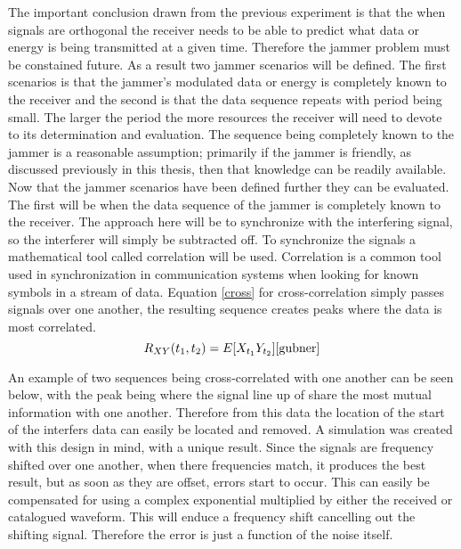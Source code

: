 The important conclusion drawn from the previous experiment is that the when signals are orthogonal the receiver needs to be able to predict what data or energy is being transmitted at a given time.  Therefore the jammer problem must be constained future.  As a result two jammer scenarios will be defined.  The first scenarios is that the jammer's modulated data or energy is completely known to the receiver and the second is that the data sequence repeats with period being small.  The larger the period the more resources the receiver will need to devote to its determination and evaluation.  The sequence being completely known to the jammer is a reasonable assumption; primarily if the jammer is friendly, as discussed previously in this thesis, then that knowledge can be readily available.\\

Now that the jammer scenarios have been defined further they can be evaluated.  The first will be when the data sequence of the jammer is completely known to the receiver.  The approach here will be to synchronize with the interfering signal, so the interferer will simply be subtracted off.  To synchronize the signals a mathematical tool called correlation will be used.  Correlation is a common tool used in synchronization in communication systems when looking for known symbols in a stream of data.  Equation \ref{cross} for cross-correlation simply passes signals over one another, the resulting sequence creates peaks where the data is most correlated.\\

\begin{equation}\label{cross}
R_{XY}(t_{1},t_{2})=E[X_{t_{1}}Y_{t_{2}}] \cite{gubner}
\end{equation}

An example of two sequences being cross-correlated with one another can be seen below, with the peak being where the signal line up of share the most mutual information with one another.  Therefore from this data the location of the start of the interfers data can easily be located and removed.  A simulation was created with this design in mind, with a unique result.  Since the signals are frequency shifted over one another, when there frequencies match, it produces the best result, but as soon as they are offset, errors start to occur.  This can easily be compensated for using a complex exponential multiplied by either the received or catalogued waveform.  This will enduce a frequency shift cancelling out the shifting signal.  Therefore the error is just a function of the noise itself.\\

